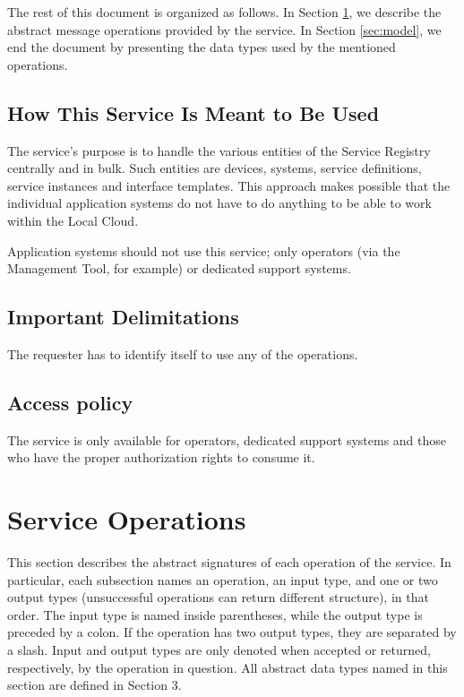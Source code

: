 \documentclass[a4paper]{arrowhead}
\begin{document}
The rest of this document is organized as follows.
In Section \ref{sec:functions}, we describe the abstract message operations provided by the service.
In Section \ref{sec:model}, we end the document by presenting the data types used by the mentioned operations.

\subsection{How This Service Is Meant to Be Used}
The service's purpose is to handle the various entities of the Service Registry centrally and in bulk. Such entities are devices, systems, service definitions, service instances and interface templates. This approach makes possible that the individual application systems do not have to do anything to be able to work within the Local Cloud.

Application systems should not use this service; only operators (via the Management Tool, for example) or dedicated support systems.

\subsection{Important Delimitations}
\label{sec:delimitations}

The requester has to identify itself to use any of the operations.

\subsection{Access policy}
\label{sec:accesspolicy}

The service is only available for operators, dedicated support systems and those who have the proper authorization rights to consume it.

\newpage

\section{Service Operations}
\label{sec:functions}

This section describes the abstract signatures of each operation of the service. 
In particular, each subsection names an operation, an input type, and one or two output types (unsuccessful operations can return different structure), in that order.
The input type is named inside parentheses, while the output type is preceded by a colon. If the operation has two output types, they are separated by a slash.
Input and output types are only denoted when accepted or returned, respectively, by the operation in question. All abstract data types named in this section are defined in Section 3.
\end{document}
